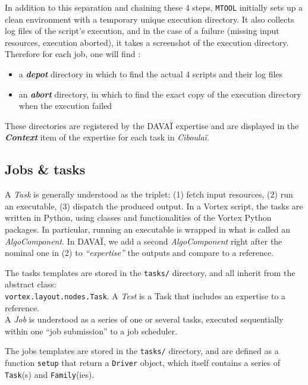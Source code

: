 \documentclass[a4paper,10pt,twoside]{article}
\begin{document}
In addition to this separation and chaining these 4 steps, \texttt{MTOOL} initially sets up a clean environment with a temporary unique execution directory.
It also collects log files of the script's execution, and in the case of a failure (missing input resources, execution aborted), it takes a screenshot of the execution directory.
Therefore for each job, one will find :
\begin{itemize}
 \item a \textit{\textbf{depot}} directory in which to find the actual 4 scripts and their log files
 \item an \textit{\textbf{abort}} directory, in which to find the exact copy of the execution directory when the execution failed
\end{itemize}

\noindent These directories are registered by the DAVAÏ expertise and are displayed in the \textit{\textbf{Context}} item of the expertise for each task in \textit{Ciboulaï}.
 


\subsection{Jobs \& tasks}

A \textit{Task} is generally understood as the triplet: (1) fetch input resources, (2) run an executable, (3) dispatch the produced output.
In a Vortex script, the tasks are written in Python, using classes and functionalities of the Vortex Python packages. In particular, running an executable is wrapped in what is called an \textit{AlgoComponent}. In DAVAÏ, we add a second \textit{AlgoComponent} right after the nominal one in (2) to \textit{``expertise''} the outputs and compare to a reference.

The tasks templates are stored in the \texttt{tasks/} directory, and all inherit from the abstract class:\\ \texttt{vortex.layout.nodes.Task}.
A \textit{Test} is a Task that includes an expertise to a reference.\\

A \textit{Job} is understood as a series of one or several tasks, executed sequentially within one ``job submission'' to a job scheduler.

The jobs templates are stored in the \texttt{tasks/} directory, and are defined as a function \texttt{setup} that return a \texttt{Driver} object, which itself contains a series of \texttt{Task}(s) and \texttt{Family}(ies).
\end{document}
